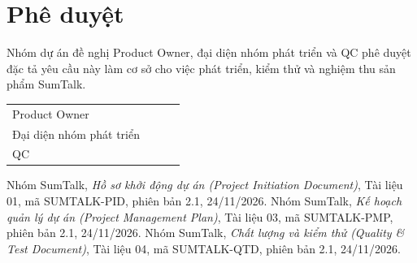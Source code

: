 \documentclass[12pt,a4paper]{report}
\begin{document}
\section{Phê duyệt}

Nhóm dự án đề nghị Product Owner, đại diện nhóm phát triển và QC phê duyệt đặc tả yêu cầu này làm cơ sở cho việc
phát triển, kiểm thử và nghiệm thu sản phẩm SumTalk.

\begin{table}[H]
  \centering
  \renewcommand{\arraystretch}{2.4}
  \begin{tabularx}{\linewidth}{@{}P{4.2cm}LP{3.2cm}P{2.6cm}@{}}
    \toprule
     &  &  &  \\
    \midrule
    Product Owner & & & \\
    Đại diện nhóm phát triển & & & \\
    QC & & & \\
    \bottomrule
  \end{tabularx}
\end{table}

\begin{thebibliography}{9}
   Nhóm SumTalk, \emph{Hồ sơ khởi động dự án (Project Initiation Document)}, Tài liệu 01,
    mã SUMTALK-PID, phiên bản 2.1, 24/11/2026.
   Nhóm SumTalk, \emph{Kế hoạch quản lý dự án (Project Management Plan)}, Tài liệu 03,
    mã SUMTALK-PMP, phiên bản 2.1, 24/11/2026.
   Nhóm SumTalk, \emph{Chất lượng và kiểm thử (Quality \& Test Document)}, Tài liệu 04,
    mã SUMTALK-QTD, phiên bản 2.1, 24/11/2026.
\end{thebibliography}
\end{document}
